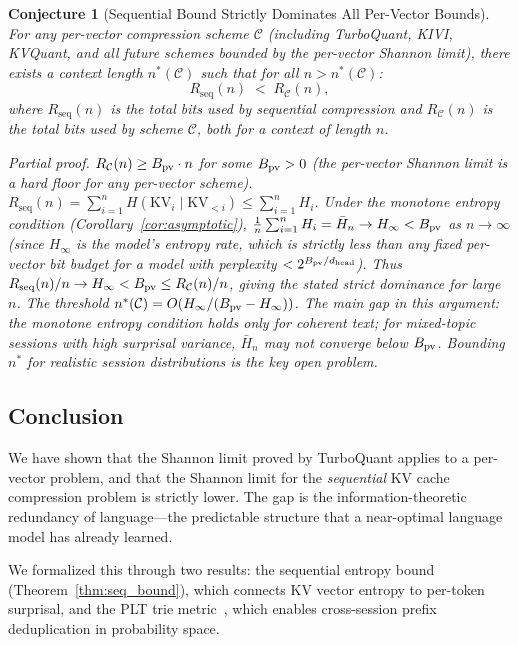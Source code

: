 \documentclass[11pt]{article}
\newtheorem{conjecture}{Conjecture}
\begin{document}
\begin{conjecture}[Sequential Bound Strictly Dominates All Per-Vector Bounds]
\label{conj:strict_dominance}
For any per-vector compression scheme $\mathcal{C}$ (including TurboQuant,
KIVI, KVQuant, and all future schemes bounded by the per-vector Shannon
limit), there exists a context length $n^*(\mathcal{C})$ such that for all
$n > n^*(\mathcal{C})$:
\[
  R_{\mathrm{seq}}(n) \;<\; R_{\mathcal{C}}(n),
\]
where $R_{\mathrm{seq}}(n)$ is the total bits used by sequential compression and
$R_{\mathcal{C}}(n)$ is the total bits used by scheme $\mathcal{C}$, both for
a context of length $n$.

\emph{Partial proof.}
$R_{\mathcal{C}}(n) \geq B_{\rm pv} \cdot n$ for some $B_{\rm pv} > 0$ (the
per-vector Shannon limit is a hard floor for any per-vector scheme).
$R_{\mathrm{seq}}(n) = \sum_{i=1}^n H(\mathrm{KV}_i \mid \mathrm{KV}_{<i})
\leq \sum_{i=1}^n H_i$.
Under the monotone entropy condition (Corollary~\ref{cor:asymptotic}),
$\frac{1}{n}\sum_{i=1}^n H_i = \bar{H}_n \to H_\infty < B_{\rm pv}$
as $n \to \infty$ (since $H_\infty$ is the model's entropy rate, which is
strictly less than any fixed per-vector bit budget for a model with perplexity
$< 2^{B_{\rm pv}/d_{\rm head}}$).  Thus $R_{\mathrm{seq}}(n)/n \to H_\infty < B_{\rm pv}
\leq R_{\mathcal{C}}(n)/n$, giving the stated strict dominance for large $n$.
The threshold $n^*(\mathcal{C}) = O(H_\infty / (B_{\rm pv} - H_\infty))$.
The main gap in this argument: the monotone entropy condition holds only for
coherent text; for mixed-topic sessions with high surprisal variance, $\bar{H}_n$
may not converge below $B_{\rm pv}$.  Bounding $n^*$ for realistic session
distributions is the key open problem.
\end{conjecture}

\subsection{Conclusion}

We have shown that the Shannon limit proved by TurboQuant applies to a
per-vector problem, and that the Shannon limit for the \emph{sequential}
KV cache compression problem is strictly lower.  The gap is the information-theoretic
redundancy of language---the predictable structure that a near-optimal language
model has already learned.

We formalized this through two results: the sequential entropy bound
(Theorem~\ref{thm:seq_bound}), which connects KV vector entropy to per-token
surprisal, and the PLT trie metric~\cite{plt2026}, which enables cross-session
prefix deduplication in probability space.
\end{document}
